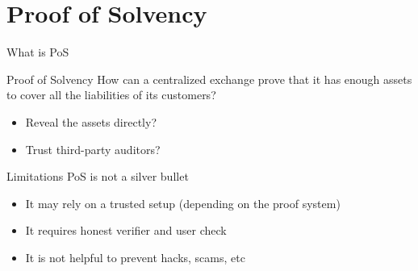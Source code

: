 \documentclass{beamer}
\begin{document}

  \section{Proof of Solvency}

  \begin{frame}{What is PoS}
    \begin{block}{Proof of Solvency}
    How can a centralized exchange prove that it has enough assets to cover all the liabilities of its customers?
    \begin{itemize}
      \item Reveal the assets directly?
      \item Trust third-party auditors?
    \end{itemize}
    \end{block}
    \vspace{-0.5em}
    \vspace{-0.5em}
  \end{frame}

  \begin{frame}{Limitations}
    PoS is not a silver bullet
    \begin{itemize}
        \item It may rely on a trusted setup (depending on the proof system)
        \item It requires honest verifier and user check
        \item It is not helpful to prevent hacks, scams, etc
    \end{itemize}  
  \end{frame}
\end{document}
